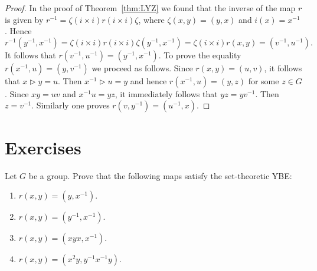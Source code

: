 \begin{proof}
In the proof of Theorem~\ref{thm:LYZ} we found that 
the inverse of the map $r$ is given by $r^{-1}=\zeta (i\times i) r (i\times i) \zeta$,
where $\zeta(x,y)=(y,x)$ and $i(x)=x^{-1}$. Hence 
\[
r^{-1}(y^{-1},x^{-1})=\zeta (i\times i) r (i\times i) \zeta(y^{-1},x^{-1})=\zeta (i\times i) r (x,y)=(v^{-1},u^{-1}).
\]
It follows that $r(v^{-1},u^{-1})=(y^{-1},x^{-1})$.  
To prove the equality $r(x^{-1},u)=(y,v^{-1})$ we proceed as follows. Since $r(x,y)=(u,v)$, it 
follows that $x\rhd y=u$. Then $x^{-1}\rhd u=y$ and
hence $r(x^{-1},u)=(y,z)$ for some $z\in G$. 
Since $xy=uv$ and $x^{-1}u=yz$, it immediately follows that $yz=yv^{-1}$. Then 
$z=v^{-1}$. Similarly one proves $r(v,y^{-1})=(u^{-1},x)$.
\end{proof}
%
%

\section*{Exercises}

\begin{prob}
\label{prob:Wada}
Let $G$ be a group. Prove that the following maps satisfy the set-theoretic YBE:
\begin{enumerate}[label=\alph*)]
\item $r(x,y)=(y,x^{-1})$.
\item $r(x,y)=(y^{-1},x^{-1})$.
\item $r(x,y)=(xyx,x^{-1})$.
\item $r(x,y)=(x^2y,y^{-1}x^{-1}y)$.	
\end{enumerate}	
\end{prob}

